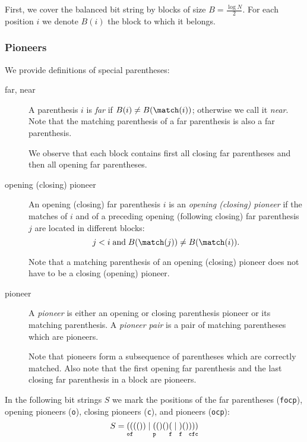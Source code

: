 \bigbreak

First, we cover the balanced bit string by blocks of size $B = \frac{\log N}{2}$.
For each position $i$ we denote $B(i)$ the block to which it belongs.

\subsubsection{Pioneers}

We provide definitions of special parentheses:
\begin{description}
	\item[far, near] 
	A parenthesis $i$ is \emph{far} if $B(i) \ne B(\match(i))$; otherwise we call it \emph{near}.
	Note that the matching parenthesis of a far parenthesis is also a far parenthesis.
	
	We observe that each block contains first all closing far parentheses and then all opening far parentheses.
	
	\item[opening (closing) pioneer]
	An opening (closing) far parenthesis $i$ is an \emph{opening (closing) pioneer} if the matches of $i$ and of a preceding opening (following closing) far parenthesis $j$ are located in different blocks:
	$$ j < i \booland B(\match(j)) \ne B(\match(i)). $$
	
	Note that a matching parenthesis of an opening (closing) pioneer does not have to be a closing (opening) pioneer.
	
	\item[pioneer]
	A \emph{pioneer} is either an opening or closing parenthesis pioneer or its matching parenthesis.
	A \emph{pioneer pair} is a pair of matching parentheses which are pioneers.
	
	Note that pioneers form a subsequence of parentheses which are correctly matched.
	Also note that the first opening far parenthesis and the last closing far parenthesis in a block are pioneers.
\end{description}

\begin{example}
	In the following bit strings $S$ we mark the positions of the far parentheses (\texttt{focp}), opening pioneers (\texttt{o}), closing pioneers (\texttt{c}), and pioneers (\texttt{ocp}):
	$$ S = \mathtt{\x(o \x(f ( ( ) ) \mid \x(p ( ) ( ) \x(f \mid \x)f ( ) \x)c \x)f \x)c} $$
\end{example}

